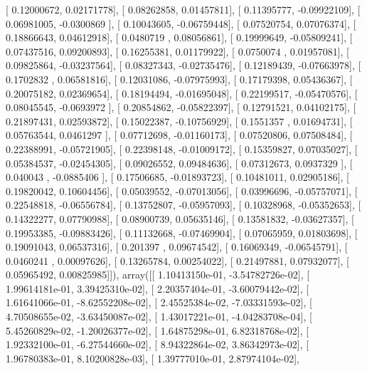 \documentclass{article}
\begin{document}
       [ 0.12000672,  0.02171778],
       [ 0.08262858,  0.01457811],
       [ 0.11395777, -0.09922109],
       [ 0.06981005, -0.0300869 ],
       [ 0.10043605, -0.06759448],
       [ 0.07520754,  0.07076374],
       [ 0.18866643,  0.04612918],
       [ 0.0480719 ,  0.08056861],
       [ 0.19999649, -0.05809241],
       [ 0.07437516,  0.09200893],
       [ 0.16255381,  0.01179922],
       [ 0.0750074 ,  0.01957081],
       [ 0.09825864, -0.03237564],
       [ 0.08327343, -0.02735476],
       [ 0.12189439, -0.07663978],
       [ 0.1702832 ,  0.06581816],
       [ 0.12031086, -0.07975993],
       [ 0.17179398,  0.05436367],
       [ 0.20075182,  0.02369654],
       [ 0.18194494, -0.01695048],
       [ 0.22199517, -0.05470576],
       [ 0.08045545, -0.0693972 ],
       [ 0.20854862, -0.05822397],
       [ 0.12791521,  0.04102175],
       [ 0.21897431,  0.02593872],
       [ 0.15022387, -0.10756929],
       [ 0.1551357 ,  0.01694731],
       [ 0.05763544,  0.0461297 ],
       [ 0.07712698, -0.01160173],
       [ 0.07520806,  0.07508484],
       [ 0.22388991, -0.05721905],
       [ 0.22398148, -0.01009172],
       [ 0.15359827,  0.07035027],
       [ 0.05384537, -0.02454305],
       [ 0.09026552,  0.09484636],
       [ 0.07312673,  0.0937329 ],
       [ 0.040043  , -0.0885406 ],
       [ 0.17506685, -0.01893723],
       [ 0.10481011,  0.02905186],
       [ 0.19820042,  0.10604456],
       [ 0.05039552, -0.07013056],
       [ 0.03996696, -0.05757071],
       [ 0.22548818, -0.06556784],
       [ 0.13752807, -0.05957093],
       [ 0.10328968, -0.05352653],
       [ 0.14322277,  0.07790988],
       [ 0.08900739,  0.05635146],
       [ 0.13581832, -0.03627357],
       [ 0.19953385, -0.09883426],
       [ 0.11132668, -0.07469904],
       [ 0.07065959,  0.01803698],
       [ 0.19091043,  0.06537316],
       [ 0.201397  ,  0.09674542],
       [ 0.16069349, -0.06545791],
       [ 0.0460241 ,  0.00097626],
       [ 0.13265784,  0.00254022],
       [ 0.21497881,  0.07932077],
       [ 0.05965492,  0.00825985]]), array([[  1.10413150e-01,  -3.54782726e-02],
       [  1.99614181e-01,   3.39425310e-02],
       [  2.20357404e-01,  -3.60079442e-02],
       [  1.61641066e-01,  -8.62552208e-02],
       [  2.45525384e-02,  -7.03331593e-02],
       [  4.70508655e-02,  -3.63450087e-02],
       [  1.43017221e-01,  -4.04283708e-04],
       [  5.45260829e-02,  -1.20026377e-02],
       [  1.64875298e-01,   6.82318768e-02],
       [  1.92332100e-01,  -6.27544660e-02],
       [  8.94322864e-02,   3.86342973e-02],
       [  1.96780383e-01,   8.10200828e-03],
       [  1.39777010e-01,   2.87974104e-02],
\end{document}
